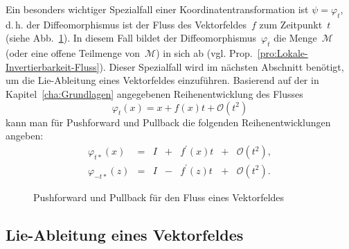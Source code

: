 Ein besonders wichtiger Spezialfall einer Koordinatentransformation
ist $\psi=\varphi_{t}$, d.\,h. der Diffeomorphismus ist der Fluss
des Vektor\-feldes~$f$ zum Zeitpunkt~$t$ (siehe Abb.~\ref{fig:Push-Forward-Pull-Back-Fluss-VF}).
In diesem Fall bildet der Diffeomorphismus~$\varphi_{t}$ die Menge~$\mathcal{M}$
(oder eine offene Teilmenge von~$\mathcal{M}$) in sich ab (vgl.
Prop.~\ref{pro:Lokale-Invertierbarkeit-Fluss}). Dieser Spezialfall
wird im nächsten Abschnitt benötigt, um die Lie-Ableitung eines Vektorfeldes
einzuführen. Basierend auf der in Kapitel~\ref{cha:Grundlagen} angegebenen
Reihenentwicklung des Flusses
\begin{equation}
\varphi_{t}(x)=x+f(x)t+\mathcal{O}(t^{2})\label{eq:fluss-Reihenentwicklung-diff-geo}
\end{equation}
kann man für Pushforward und Pullback die folgenden Reihenentwicklungen
angeben: 
\begin{equation}
\begin{array}{lllllll}
\varphi_{t*}(x) & = & I & + & f^{\prime}(x)t & + & \mathcal{O}(t^{2}),\\
\varphi_{-t*}(z) & = & I & - & f^{\prime}(z)t & + & \mathcal{O}(t^{2}).
\end{array}\label{eq:push-pull-Reihenentw}
\end{equation}

\begin{figure}
\begin{centering}
\resizebox{0.55\textwidth}{!}{}
\par\end{centering}
\caption{Pushforward und Pullback für den Fluss eines Vektorfeldes\label{fig:Push-Forward-Pull-Back-Fluss-VF}}
\end{figure}


\subsection{Lie-Ableitung eines Vektorfeldes\label{subsec:Lie-Ableitung-Vektorfeld}}

